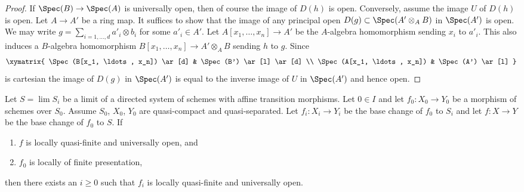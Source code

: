 \begin{proof}
If $\Spec(B) \to \Spec(A)$ is universally open, then of course
the image of $D(h)$ is open. Conversely, assume the image $U$ of
$D(h)$ is open. Let $A \to A'$ be a ring map. It suffices to show
that the image of any principal open $D(g) \subset \Spec(A' \otimes_A B)$
in $\Spec(A')$ is open. We may write
$g = \sum_{i = 1, \ldots, d} a'_i \otimes b_i$ for some $a'_i \in A'$.
Let $A[x_1, \ldots, x_n] \to A'$ be the $A$-algebra homomorphism
sending $x_i$ to $a'_i$. This also induces a $B$-algebra
homomorphism $B[x_1, \ldots, x_n] \to A' \otimes_A B$ sending $h$ to $g$.
Since
$$
\xymatrix{
\Spec(B[x_1, \ldots, x_n]) \ar[d] &
\Spec(B') \ar[l] \ar[d] \\
\Spec(A[x_1, \ldots, x_n]) &
\Spec(A') \ar[l]
}
$$
is cartesian the image of $D(g)$ in $\Spec(A')$ is equal to the
inverse image of $U$ in $\Spec(A')$ and hence open.
\end{proof}

\begin{lemma}
\label{lemma-descend-quasi-finite-universally-open}
Let $S = \lim S_i$ be a limit of a directed system of schemes
with affine transition morphisms.
Let $0 \in I$ and let $f_0 : X_0 \to Y_0$ be a morphism of schemes over $S_0$.
Assume $S_0$, $X_0$, $Y_0$ are quasi-compact and quasi-separated.
Let $f_i : X_i \to Y_i$ be the base change of $f_0$ to $S_i$ and
let $f : X \to Y$ be the base change of $f_0$ to $S$.
If
\begin{enumerate}
\item $f$ is locally quasi-finite and universally open, and
\item $f_0$ is locally of finite presentation,
\end{enumerate}
then there exists an $i \geq 0$ such that $f_i$ is locally quasi-finite
and universally open.
\end{lemma}

